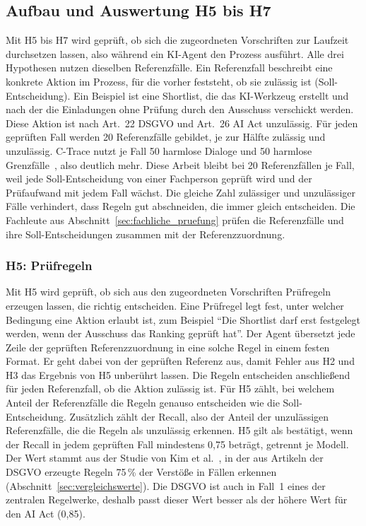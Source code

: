 \subsection{Aufbau und Auswertung H5 bis H7}\label{sec:h5_h7}
Mit H5 bis H7 wird geprüft, ob sich die zugeordneten Vorschriften zur Laufzeit durchsetzen lassen, also während ein KI-Agent den Prozess ausführt.
Alle drei Hypothesen nutzen dieselben Referenzfälle.
Ein Referenzfall beschreibt eine konkrete Aktion im Prozess, für die vorher feststeht, ob sie zulässig ist (Soll-Entscheidung).
Ein Beispiel ist eine Shortlist, die das KI-Werkzeug erstellt und nach der die Einladungen ohne Prüfung durch den Ausschuss verschickt werden.
Diese Aktion ist nach Art.~22 DSGVO und Art.~26 AI Act unzulässig.
Für jeden geprüften Fall werden 20 Referenzfälle gebildet, je zur Hälfte zulässig und unzulässig.
C-Trace nutzt je Fall 50 harmlose Dialoge und 50 harmlose Grenzfälle~\cite{kahani2026}, also deutlich mehr.
Diese Arbeit bleibt bei 20 Referenzfällen je Fall, weil jede Soll-Entscheidung von einer Fachperson geprüft wird und der Prüfaufwand mit jedem Fall wächst.
Die gleiche Zahl zulässiger und unzulässiger Fälle verhindert, dass Regeln gut abschneiden, die immer gleich entscheiden.
Die Fachleute aus Abschnitt~\ref{sec:fachliche_pruefung} prüfen die Referenzfälle und ihre Soll-Entscheidungen zusammen mit der Referenzzuordnung.

\subsubsection{H5: Prüfregeln}
Mit H5 wird geprüft, ob sich aus den zugeordneten Vorschriften Prüfregeln erzeugen lassen, die richtig entscheiden.
Eine Prüfregel legt fest, unter welcher Bedingung eine Aktion erlaubt ist, zum Beispiel \enquote{Die Shortlist darf erst festgelegt werden, wenn der Ausschuss das Ranking geprüft hat}.
Der Agent übersetzt jede Zeile der geprüften Referenzzuordnung in eine solche Regel in einem festen Format.
Er geht dabei von der geprüften Referenz aus, damit Fehler aus H2 und H3 das Ergebnis von H5 unberührt lassen.
Die Regeln entscheiden anschließend für jeden Referenzfall, ob die Aktion zulässig ist.
Für H5 zählt, bei welchem Anteil der Referenzfälle die Regeln genauso entscheiden wie die Soll-Entscheidung.
Zusätzlich zählt der Recall, also der Anteil der unzulässigen Referenzfälle, die die Regeln als unzulässig erkennen.
H5 gilt als bestätigt, wenn der Recall in jedem geprüften Fall mindestens 0,75 beträgt, getrennt je Modell.
Der Wert stammt aus der Studie von Kim et al.~\cite{kim2026}, in der aus Artikeln der DSGVO erzeugte Regeln 75\,\% der Verstöße in Fällen erkennen (Abschnitt~\ref{sec:vergleichswerte}).
Die DSGVO ist auch in Fall~1 eines der zentralen Regelwerke, deshalb passt dieser Wert besser als der höhere Wert für den AI Act (0,85).

